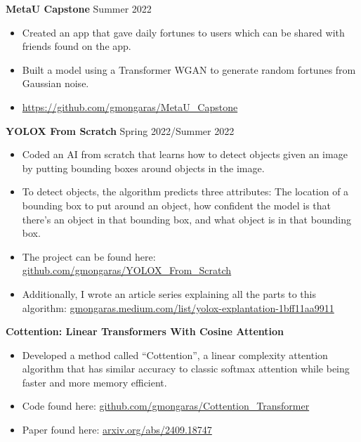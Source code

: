 \documentclass[a4paper,10pt]{article}
\begin{document}
\noindent\textbf{MetaU Capstone} \hfill Summer 2022
\begin{itemize}[noitemsep,topsep=0pt]
  \item Created an app that gave daily fortunes to users which can be shared with friends found on the app.
  \item Built a model using a Transformer WGAN to generate random fortunes from Gaussian noise.
  \item \href{https://github.com/gmongaras/MetaU_Capstone}{https://github.com/gmongaras/MetaU\_Capstone}
\end{itemize}

\noindent\textbf{YOLOX From Scratch} \hfill Spring 2022/Summer 2022
\begin{itemize}[noitemsep,topsep=0pt]
  \item Coded an AI from scratch that learns how to detect objects given an image by putting bounding boxes around objects in the image.
  \item To detect objects, the algorithm predicts three attributes: The location of a bounding box to put around an object, how confident the model is that there’s an object in that bounding box, and what object is in that bounding box.
  \item  The project can be found here: \href{https://github.com/gmongaras/YOLOX_From_Scratch}{github.com/gmongaras/YOLOX\_From\_Scratch}
  \item  Additionally, I wrote an article series explaining all the parts to this algorithm:
\href{https://gmongaras.medium.com/list/yolox-explantation-1bff11aa9911}{gmongaras.medium.com/list/yolox-explantation-1bff11aa9911}
\end{itemize}






\vspace{5pt}
 \vspace{1pt}


\noindent\textbf{Cottention: Linear Transformers With Cosine Attention}
\begin{itemize}[noitemsep,topsep=0pt]
  \item Developed a method called “Cottention”, a linear complexity attention algorithm that has similar accuracy to classic softmax attention while being faster and more memory efficient.
  \item Code found here: \href{https://github.com/gmongaras/Cottention_Transformer}{github.com/gmongaras/Cottention\_Transformer}
  \item Paper found here: \href{https://arxiv.org/abs/2409.18747}{arxiv.org/abs/2409.18747}
\end{itemize}
\end{document}
